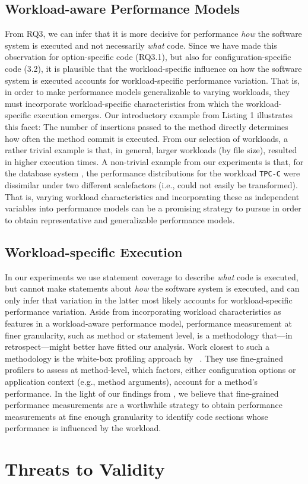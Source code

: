 {\subsection{Workload-aware Performance Models}
From RQ3, we can infer that it is more decisive for performance \textit{how} the software system is executed and not necessarily \textit{what} code. Since we have made this observation for option-specific code (RQ3.1), but also for configuration-specific code (3.2), it is plausible that the workload-specific influence on how the software system is executed accounts for workload-specific performance variation. That is, in order to make performance models generalizable to varying workloads, they must incorporate workload-specific characteristics from which the workload-specific execution emerges. 
Our introductory example from Listing 1 illustrates this facet: The number of insertions passed to the method directly determines how often the method commit is executed. From our selection of workloads, a rather trivial example is that, in general, larger workloads (by file size), resulted in higher execution times. A non-trivial example from our experiments is that, for the database system \htwo, the performance distributions for the workload \texttt{TPC-C} were dissimilar under two different scalefactors (i.e., could not easily be transformed). 
That is, varying workload characteristics and incorporating these as independent variables into performance models can be a promising strategy to pursue in order to obtain representative and generalizable performance models. 

\subsection{Workload-specific Execution}
In our experiments we use statement coverage to describe \emph{what} code is executed, but cannot make statements about \emph{how} the software system is executed, and can only infer that variation in the latter most likely accounts for workload-specific performance variation. Aside from incorporating workload characteristics as features in a workload-aware performance model, performance measurement at finer granularity, such as method or statement level, is a methodology that---in retrospect---might better have fitted our analysis. Work closest to such a methodology is the white-box profiling approach by \citeauthor{weber_white_2021}~\cite{weber_white_2021}. They use fine-grained profilers to assess at method-level, which factors, either configuration options or application context (e.g., method arguments), account for a method's performance. In the light of our findings from , we believe that fine-grained performance measurements are a worthwhile strategy to obtain performance measurements at fine enough granularity to identify code sections whose performance is influenced by the workload.

}\section{Threats to Validity}\label{sec:threats}

